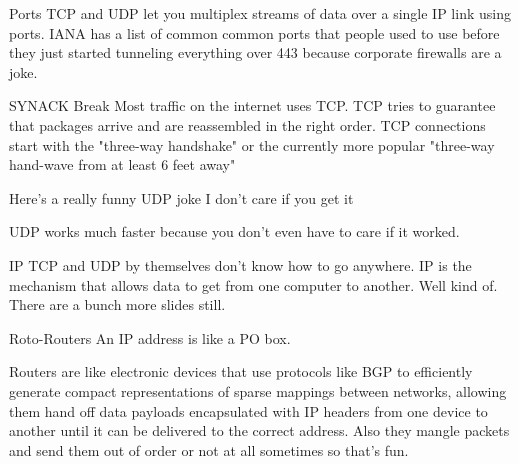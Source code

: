 \documentclass[presentation]{beamer}
\begin{document}
\begin{frame}[label={sec:org2c5ff37}]{Ports}
TCP and UDP let you multiplex streams of data over a single IP link
using ports. IANA has a list of common common ports that people used
to use before they just started tunneling everything over 443 because
corporate firewalls are a joke.
\end{frame}

\begin{frame}[label={sec:org92a3697}]{SYNACK Break}
Most traffic on the internet uses TCP.  TCP tries to guarantee that
packages arrive and are reassembled in the right order. TCP
connections start with the "three-way handshake" or the currently more
popular "three-way hand-wave from at least 6 feet away"
\end{frame}

\begin{frame}[label={sec:orgc988bae}]{Here's a really funny UDP joke}
I don't care if you get it

\pause
UDP works much faster because you don't even have to care if it
worked.
\end{frame}

\begin{frame}[label={sec:orgcb64cb8}]{IP}
TCP and UDP by themselves don't know how to go anywhere. IP is the
mechanism that allows data to get from one computer to another.  Well
kind of.  There are a bunch more slides still.
\end{frame}

\begin{frame}[label={sec:org1871bc3}]{Roto-Routers}
An IP address is like a PO box.

Routers are like electronic devices that use protocols like BGP to
efficiently generate compact representations of sparse mappings
between networks, allowing them hand off data payloads encapsulated
with IP headers from one device to another until it can be delivered
to the correct address.
\pause
Also they mangle packets and send them out of order or not at all
sometimes so that's fun.
\end{frame}
\end{document}
